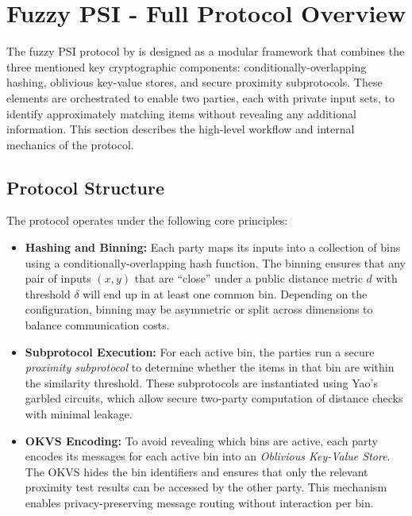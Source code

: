 \section{Fuzzy PSI - Full Protocol Overview}

The fuzzy PSI protocol by \textcite{richardsonFuzzyPSIOblivious2024} is designed as a modular framework that combines the three mentioned key cryptographic components: conditionally-overlapping hashing, oblivious key-value stores, and secure proximity subprotocols. These elements are orchestrated to enable two parties, each with private input sets, to identify approximately matching items without revealing any additional information. This section describes the high-level workflow and internal mechanics of the protocol.

\subsection{Protocol Structure}

The protocol operates under the following core principles:

\begin{itemize}
	\item \textbf{Hashing and Binning:} Each party maps its inputs into a collection of bins using a conditionally-overlapping hash function. The binning ensures that any pair of inputs $(x, y)$ that are ``close'' under a public distance metric $d$ with threshold $\delta$ will end up in at least one common bin. Depending on the configuration, binning may be asymmetric or split across dimensions to balance communication costs.

	\item \textbf{Subprotocol Execution:} For each active bin, the parties run a secure \emph{proximity subprotocol} to determine whether the items in that bin are within the similarity threshold. These subprotocols are instantiated using Yao's garbled circuits, which allow secure two-party computation of distance checks with minimal leakage.

	\item \textbf{OKVS Encoding:} To avoid revealing which bins are active, each party encodes its messages for each active bin into an \emph{Oblivious Key-Value Store}. The OKVS hides the bin identifiers and ensures that only the relevant proximity test results can be accessed by the other party. This mechanism enables privacy-preserving message routing without interaction per bin.
\end{itemize}

